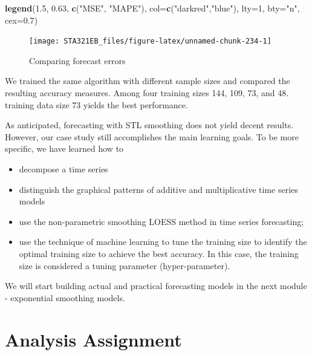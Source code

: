 \documentclass[
]{book}
\newenvironment{Shaded}{\begin{snugshade}}{\end{snugshade}}
\newcommand{\AttributeTok}[1]{\textcolor[rgb]{0.13,0.29,0.53}{#1}}
\newcommand{\DecValTok}[1]{\textcolor[rgb]{0.00,0.00,0.81}{#1}}
\newcommand{\FloatTok}[1]{\textcolor[rgb]{0.00,0.00,0.81}{#1}}
\newcommand{\FunctionTok}[1]{\textcolor[rgb]{0.13,0.29,0.53}{\textbf{#1}}}
\newcommand{\NormalTok}[1]{#1}
\newcommand{\StringTok}[1]{\textcolor[rgb]{0.31,0.60,0.02}{#1}}
\begin{document}
\begin{Shaded}
\begin{Highlighting}[]
\FunctionTok{legend}\NormalTok{(}\FloatTok{1.5}\NormalTok{, }\FloatTok{0.63}\NormalTok{, }\FunctionTok{c}\NormalTok{(}\StringTok{"MSE"}\NormalTok{, }\StringTok{"MAPE"}\NormalTok{), }\AttributeTok{col=}\FunctionTok{c}\NormalTok{(}\StringTok{"darkred"}\NormalTok{,}\StringTok{"blue"}\NormalTok{), }\AttributeTok{lty=}\DecValTok{1}\NormalTok{, }\AttributeTok{bty=}\StringTok{"n"}\NormalTok{, }\AttributeTok{cex=}\FloatTok{0.7}\NormalTok{)}
\end{Highlighting}
\end{Shaded}

\begin{figure}

{\centering \texttt{[image: STA321EB\_files/figure-latex/unnamed-chunk-234-1]} 

}

\caption{Comparing forecast errors}\label{fig:unnamed-chunk-234}
\end{figure}

We trained the same algorithm with different sample sizes and compared the resulting accuracy measures. Among four training sizes 144, 109, 73, and 48. training data size 73 yields the best performance.

As anticipated, forecasting with STL smoothing does not yield decent results. However, our case study still accomplishes the main learning goals. To be more specific, we have learned how to

\begin{itemize}
\item
  decompose a time series
\item
  distinguish the graphical patterns of additive and multiplicative time series models
\item
  use the non-parametric smoothing LOESS method in time series forecasting;
\item
  use the technique of machine learning to tune the training size to identify the optimal training size to achieve the best accuracy. In this case, the training size is considered a tuning parameter (hyper-parameter).
\end{itemize}

We will start building actual and practical forecasting models in the next module - exponential smoothing models.

\hypertarget{analysis-assignment-6}{%
\section{Analysis Assignment}\label{analysis-assignment-6}}
\end{document}
